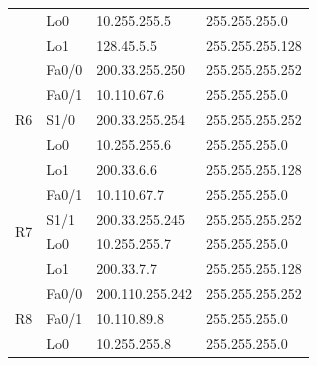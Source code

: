 \documentclass[12pt,twoside,a4paper]{report}
\begin{document}
\begin{table}[!htbp]
\begin{tabular}{|c|l|l|l|}
                     & Lo0                                     & 10.255.255.5                            & 255.255.255.0                       \\ \cline{2-4} 
                     & Lo1                                     & 128.45.5.5                              & 255.255.255.128                     \\ \hline
\multirow{5}{*}{R6}  & Fa0/0                                   & 200.33.255.250                          & 255.255.255.252                     \\ \cline{2-4} 
                     & Fa0/1                                   & 10.110.67.6                             & 255.255.255.0                       \\ \cline{2-4} 
                     & S1/0                                    & 200.33.255.254                          & 255.255.255.252                     \\ \cline{2-4} 
                     & Lo0                                     & 10.255.255.6                            & 255.255.255.0                       \\ \cline{2-4} 
                     & Lo1                                     & 200.33.6.6                              & 255.255.255.128                     \\ \hline
\multirow{4}{*}{R7}  & Fa0/1                                   & 10.110.67.7                             & 255.255.255.0                       \\ \cline{2-4} 
                     & S1/1                                    & 200.33.255.245                          & 255.255.255.252                     \\ \cline{2-4} 
                     & Lo0                                     & 10.255.255.7                            & 255.255.255.0                       \\ \cline{2-4} 
                     & Lo1                                     & 200.33.7.7                              & 255.255.255.128                     \\ \hline
\multirow{4}{*}{R8}  & Fa0/0                                   & 200.110.255.242                         & 255.255.255.252                     \\ \cline{2-4} 
                     & Fa0/1                                   & 10.110.89.8                             & 255.255.255.0                       \\ \cline{2-4} 
                     & Lo0                                     & 10.255.255.8                            & 255.255.255.0                       \\ \cline{2-4} 

\end{tabular}
\end{table}
\end{document}
